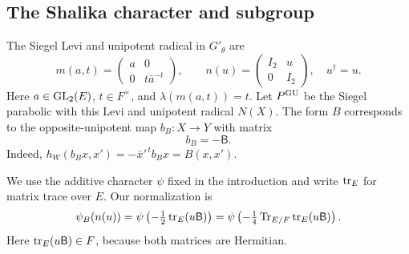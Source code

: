 \subsection{The Shalika character and subgroup}
The Siegel Levi and unipotent radical in $G'_\theta$ are
\begin{equation}\label{gu:eq:siegel-coordinates}
 m(a,t)=\begin{pmatrix}a&0\\0&t\bar a^{-t}\end{pmatrix},
 \qquad
 n(u)=\begin{pmatrix}I_2&u\\0&I_2\end{pmatrix},
 \quad u^\dagger=u.
\end{equation}
Here $a\in\operatorname{GL}_2(E)$, $t\in F^\times$, and $\lambda(m(a,t))=t$. Let $P^{\operatorname{GU}}$ be the Siegel parabolic with this Levi and unipotent radical $N(X)$. The form $B$ corresponds to the opposite-unipotent map $b_B:X\to Y$ with matrix
\[
 b_B=-\mathsf B.
\]
Indeed, $h_W(b_Bx,x')=-\bar x'^{\,t}b_Bx=B(x,x')$.

We use the additive character $\psi$ fixed in the introduction and
write $\operatorname{tr}_E$ for matrix trace over $E$. Our normalization is
\begin{equation}\label{gu:eq:psiB}
 \psi_B(n(u))
 =\psi\left(-\tfrac12\operatorname{tr}_E(u\mathsf B)\right)
 =\psi\left(-\tfrac14\operatorname{Tr}_{E/F}\operatorname{tr}_E(u\mathsf B)\right).
\end{equation}
Here $\operatorname{tr}_E(u\mathsf B)\in F$, because both matrices are Hermitian.

